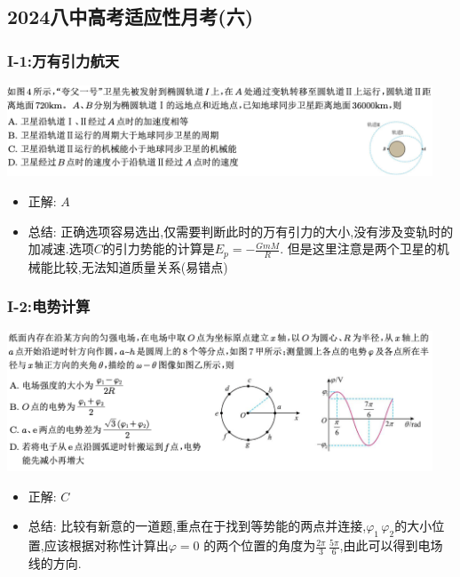 \documentclass{article}
\begin{document}
\vspace{2em}

\subsection{2024八中高考适应性月考(六)}
\subsubsection{I-1:万有引力航天}

\includegraphics[width=0.95\textwidth,keepaspectratio]{./pictures/3.2-1.png}

\begin{itemize}
    \item 正解: $A$
    \item 总结: 正确选项容易选出,仅需要判断此时的万有引力的大小,没有涉及变轨时的加减速.选项$C$的引力势能的计算是$E_{p} = - \frac{GmM}{R}$.
          但是这里注意是两个卫星的机械能比较,无法知道质量关系(易错点)
\end{itemize}

\vspace{2em}

\subsubsection{I-2:电势计算}
\includegraphics[width=0.95\textwidth,keepaspectratio]{./pictures/3.2-2.png}

\begin{itemize}
    \item 正解: $C$
    \item 总结: 比较有新意的一道题,重点在于找到等势能的两点并连接,$\varphi_{1} \, \varphi_{2}$的大小位置,应该根据对称性计算出$\varphi = 0$
          的两个位置的角度为$\frac{2\pi}{3} \, \frac{5\pi}{6} $,由此可以得到电场线的方向.
\end{itemize}
\end{document}
